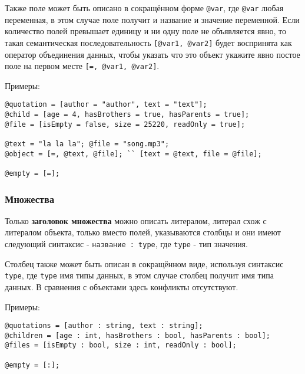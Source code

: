 Также поле может быть описано в сокращённом форме \texttt{@var}, где \texttt{@var} любая переменная, в этом случае поле получит и название и значение переменной. Если количество полей превышает единицу и ни одну поле не объявляется явно, то такая семантическая последовательность \texttt{[@var1, @var2]} будет воспринята как оператор объединения данных, чтобы указать что это объект укажите явно постое поле на первом месте \texttt{[=, @var1, @var2]}.

\noindent Примеры:
\begin{verbatim}
@quotation = [author = "author", text = "text"];
@child = [age = 4, hasBrothers = true, hasParents = true];
@file = [isEmpty = false, size = 25220, readOnly = true];

@text = "la la la"; @file = "song.mp3";
@object = [=, @text, @file]; `` [text = @text, file = @file];

@empty = [=];
\end{verbatim}

\subsubsection{Множества}

Только {\bf заголовок множества} можно описать литералом, литерал схож с литералом объекта, только вместо полей, указываются столбцы и они имеют следующий синтаксис - \texttt{название : type}, где \texttt{type} - тип значения.

Столбец также может быть описан в сокращённом виде, используя синтаксис \texttt{type}, где \texttt{type} имя типы данных, в этом случае столбец получит имя типа данных. В сравнения с объектами здесь конфликты отсутствуют.

\noindent Примеры:
\begin{verbatim}
@quotations = [author : string, text : string];
@children = [age : int, hasBrothers : bool, hasParents : bool];
@files = [isEmpty : bool, size : int, readOnly : bool];

@empty = [:];
\end{verbatim}

